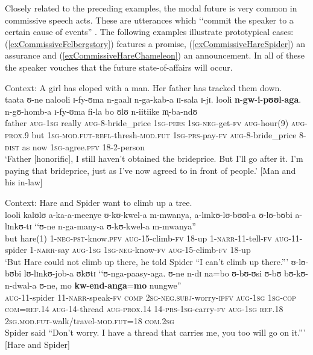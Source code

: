 Closely related to the preceding examples, the modal future is very common in commissive speech acts. These are utterances which \lq\lq commit the speaker to a certain cause of events'' \citep[156]{AustinJL1962}. The following examples illustrate prototypical cases: (\ref{exCommissiveFelbergstory}) features a promise, (\ref{exCommissiveHareSpider}) an assurance and (\ref{exCommissiveHareChameleon}) an announcement. In all of these the speaker vouches that the future state-of-affairs will occur.

\begin{exe}
\ex \label{exCommissiveFelbergstory}
Context: A girl has eloped with a man. Her father has tracked them down.\\
\gll taata ʊ-ne nalooli ɪ-fy-ʊma n-gaalɪ n-ga-kab-a ɪɪ-sala ɪ-jɪ. looli \textbf{n}-\textbf{gw}-\textbf{i}-\textbf{pʊʊl}-\textbf{aga}. n-gʊ-homb-a ɪ-fy-ʊma fi-la bo ʊlʊ n-iitiike m̩-ba-ndʊ\\
father \textsc{aug}-\textsc{1sg} really \textsc{aug}-8-bride\_price \textsc{1sg}-\textsc{pers} \textsc{1sg}-\textsc{neg}-get-\textsc{fv} \textsc{aug}-hour(9) \textsc{aug}-\textsc{prox.9} but \textsc{1sg}-\textsc{mod.fut}-\textsc{refl}-thresh-\textsc{mod.fut} \textsc{1sg}-\textsc{prs}-pay-\textsc{fv} \textsc{aug}-8-bride\_price 8-\textsc{dist} as now \textsc{1sg}-agree.\textsc{pfv} 18-2-person\\
\glt `Father [honorific], I still haven't obtained the brideprice. But I'll go after it. I'm paying that brideprice, just as I've now agreed to in front of people.' [Man and his in-law]

\ex \label{exCommissiveHareSpider}
Context: Hare and Spider want to climb up a tree.\\
\gll looli kalʊlʊ a-ka-a-meenye ʊ-kʊ-kwel-a m-mwanya, a-lɪnkʊ-lʊ-bʊʊl-a ʊ-lʊ-bʊbi a-lɪnkʊ-tɪ \textup{\lq\lq}ʊ-ne n-ga-many-a ʊ-kʊ-kwel-a m-mwanya\textup{''}\\
but hare(1) 1-\textsc{neg}-\textsc{pst}-know.\textsc{pfv} \textsc{aug}-15-climb-\textsc{fv} 18-up 1-\textsc{narr}-11-tell-\textsc{fv} \textsc{aug}-11-spider 1-\textsc{narr}-say \phantom{\lq\lq}\textsc{aug}-\textsc{1sg} \textsc{1sg}-\textsc{neg}-know-\textsc{fv} \textsc{aug}-15-climb-\textsc{fv} 18-up\\
\glt `But Hare could not climb up there, he told Spider ``I can't climb up there.''{}'
\sn \gll ʊ-lʊ-bʊbi lʊ-lɪnkʊ-job-a ʊkʊtɪ \textup{\lq\lq}ʊ-nga-paasy-aga. ʊ-ne n-dɪ na=bo ʊ-bʊ-ʊsi ʊ-bʊ bʊ-kʊ-n-dwal-a ʊ-ne, mo \textbf{kw}-\textbf{end}-\textbf{anga}=\textbf{mo} nungwe\textup{''}\\
\textsc{aug}-11-spider 11-\textsc{narr}-speak-\textsc{fv} \textsc{comp} \phantom{\lq\lq}\textsc{2sg}-\textsc{neg.subj}-worry-\textsc{ipfv} \textsc{aug}-\textsc{1sg} \textsc{1sg}-\textsc{cop} \textsc{com}=\textsc{ref.14} \textsc{aug}-14-thread \textsc{aug}-\textsc{prox.14} 14-\textsc{prs}-\textsc{1sg}-carry-\textsc{fv} \textsc{aug}-\textsc{1sg} \textsc{ref.18} \textsc{2sg.mod.fut}-walk/travel-\textsc{mod.fut}=18 \textsc{com.2sg}\\
\glt Spider said ``Don't worry. I have a thread that carries me, you too will go on it.''{}' [Hare and Spider]


\end{exe}
